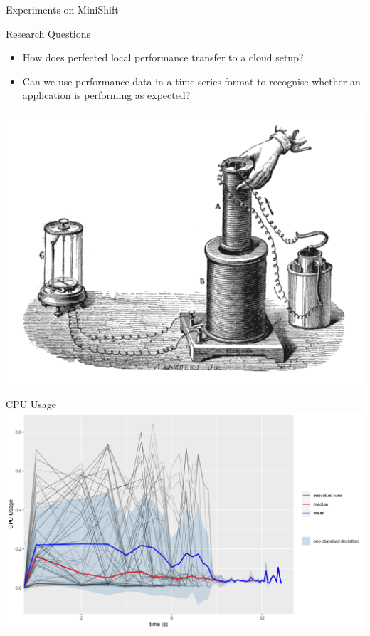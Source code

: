 \documentclass{beamer}
\begin{document}
\begin{frame}{Experiments on MiniShift}
  \begin{block}{Research Questions}
    \begin{itemize}
    \item How does perfected local performance transfer to a cloud setup?
    \item Can we use performance data in a time series format to recognise whether
      an application is performing as expected?
    \end{itemize}
  \end{block}
  \centering
  \includegraphics[height=0.6\textheight]{experiment.png}
\end{frame}

\begin{frame}{CPU Usage}
  \includegraphics[width=\textwidth]{../../plots/cpu_experiment.png}
\end{frame}
\end{document}
